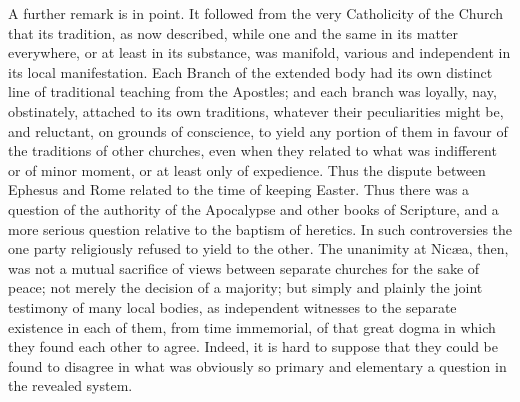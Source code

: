 A further remark is in point. It followed from
the very Catholicity of the Church that its tradition, as now
described, while one and the same in its matter everywhere, or at
least in its substance, was manifold, various and independent in its
local manifestation. Each Branch of the extended body had its own
distinct line of traditional teaching from the Apostles; and each
branch was loyally, nay, obstinately, attached to its own traditions,
whatever their peculiarities might be, and reluctant, on grounds of
conscience, to yield any portion of them in favour of the traditions
of other churches, even when they related to what was indifferent or
of minor moment, or at least only of expedience. Thus the dispute
between Ephesus and Rome related to the time of keeping Easter. Thus
there was a question of the authority of the Apocalypse and other
books of Scripture, and a more serious question relative to the
baptism of heretics. In such controversies the one party religiously
refused to yield to the other. The unanimity at Nicæa, then, was not
a mutual sacrifice of views between separate churches for the sake
of peace; not merely the decision of a majority; but simply and
plainly the joint testimony of many local bodies, as independent
witnesses to the separate existence in each of them, from time
immemorial, of that great dogma in which they found each other to
agree. Indeed, it is hard to suppose that they could be found to
disagree in what was obviously so primary and elementary a question in
the revealed system.

